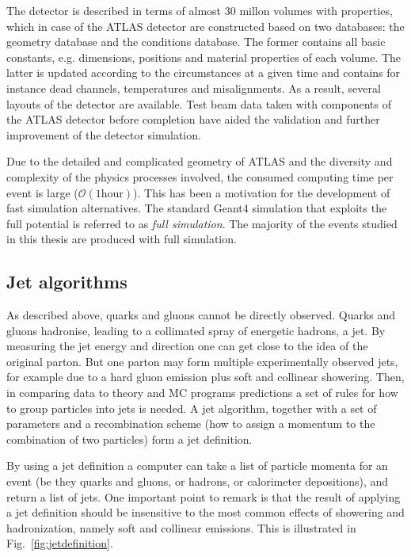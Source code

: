 The detector is described in terms of almost 30 millon volumes with properties, which in case of the ATLAS detector are constructed based on two databases: the geometry database and the conditions database. The former contains all basic constants, e.g. dimensions, positions and material properties of each volume. The latter is updated according to the circumstances at a given time and contains for instance dead channels, temperatures and misalignments. As a result, several layouts of the detector are available. Test beam data taken with components of the ATLAS detector before completion have aided the validation and further improvement of the detector simulation.

Due to the detailed and complicated geometry of ATLAS and the diversity and complexity of the physics processes involved, the consumed computing time per event is large ($\mathcal{O}(1\mbox{hour})$).  This has been a motivation for the development of fast simulation alternatives. The standard {\sc Geant}4 simulation that exploits the full potential is referred to as \emph{full simulation}.  The majority of the events studied in this thesis are produced with full simulation.



\subsection{Jet algorithms}\label{sec:jetalgos}


As described above, quarks and gluons cannot be directly observed. %
Quarks and gluons hadronise, leading to a collimated spray of energetic hadrons, a jet. By measuring the jet energy and direction one can get close to the idea of the original parton. But one parton may form multiple experimentally observed jets, for example due to a hard gluon emission plus soft and collinear showering. Then, in comparing data to theory and MC programs predictions a set of rules for how to group particles into jets is needed. A jet algorithm, together with a set of parameters and a recombination scheme (how to assign a momentum to the combination of two particles) form a jet definition.

By using a jet definition a computer can take a list of particle momenta for an event (be they quarks and gluons, or hadrons, or calorimeter depositions), and return a list of jets. One important point to remark is that the result of applying a jet definition should be insensitive to the most common effects of showering and hadronization, namely soft and collinear emissions. This is illustrated in Fig.~\ref{fig:jetdefinition}.

